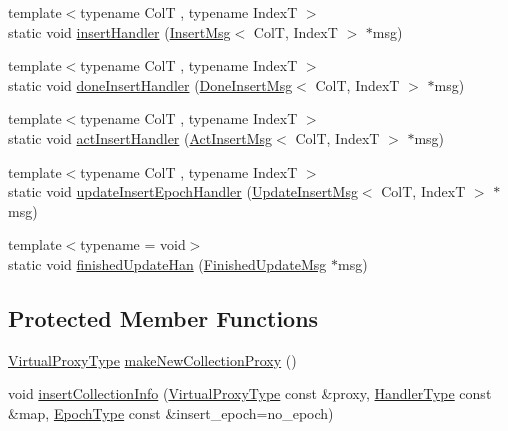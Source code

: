 \begin{DoxyCompactItemize}
\item 
{\footnotesize template$<$typename ColT , typename IndexT $>$ }\\static void \hyperlink{structvt_1_1vrt_1_1collection_1_1_collection_manager_afae2bb212583b7a9c6d73722c66961ef}{insert\+Handler} (\hyperlink{structvt_1_1vrt_1_1collection_1_1_insert_msg}{Insert\+Msg}$<$ ColT, IndexT $>$ $\ast$msg)
\item 
{\footnotesize template$<$typename ColT , typename IndexT $>$ }\\static void \hyperlink{structvt_1_1vrt_1_1collection_1_1_collection_manager_ad0d2174c1605c18dfdc028679f1505ae}{done\+Insert\+Handler} (\hyperlink{structvt_1_1vrt_1_1collection_1_1_done_insert_msg}{Done\+Insert\+Msg}$<$ ColT, IndexT $>$ $\ast$msg)
\item 
{\footnotesize template$<$typename ColT , typename IndexT $>$ }\\static void \hyperlink{structvt_1_1vrt_1_1collection_1_1_collection_manager_a0c2b3a0d98264432181392ff178d5782}{act\+Insert\+Handler} (\hyperlink{structvt_1_1vrt_1_1collection_1_1_act_insert_msg}{Act\+Insert\+Msg}$<$ ColT, IndexT $>$ $\ast$msg)
\item 
{\footnotesize template$<$typename ColT , typename IndexT $>$ }\\static void \hyperlink{structvt_1_1vrt_1_1collection_1_1_collection_manager_afe9a779bc2dd8c639cf0dea5d910ec4b}{update\+Insert\+Epoch\+Handler} (\hyperlink{structvt_1_1vrt_1_1collection_1_1_update_insert_msg}{Update\+Insert\+Msg}$<$ ColT, IndexT $>$ $\ast$msg)
\item 
{\footnotesize template$<$typename  = void$>$ }\\static void \hyperlink{structvt_1_1vrt_1_1collection_1_1_collection_manager_a1e3aca203f1197782ec543da1d16b115}{finished\+Update\+Han} (\hyperlink{structvt_1_1vrt_1_1collection_1_1_finished_update_msg}{Finished\+Update\+Msg} $\ast$msg)
\end{DoxyCompactItemize}
\subsection*{Protected Member Functions}
\begin{DoxyCompactItemize}
\item 
\hyperlink{namespacevt_a1b417dd5d684f045bb58a0ede70045ac}{Virtual\+Proxy\+Type} \hyperlink{structvt_1_1vrt_1_1collection_1_1_collection_manager_a13988c17d12744b3229d380ccef5ec07}{make\+New\+Collection\+Proxy} ()
\item 
void \hyperlink{structvt_1_1vrt_1_1collection_1_1_collection_manager_a71a055aa5cee6b18891ed946e03e4883}{insert\+Collection\+Info} (\hyperlink{namespacevt_a1b417dd5d684f045bb58a0ede70045ac}{Virtual\+Proxy\+Type} const \&proxy, \hyperlink{namespacevt_af64846b57dfcaf104da3ef6967917573}{Handler\+Type} const \&map, \hyperlink{namespacevt_a985a5adf291c34a3ca263b3378388236}{Epoch\+Type} const \&insert\+\_\+epoch=no\+\_\+epoch)
\end{DoxyCompactItemize}
